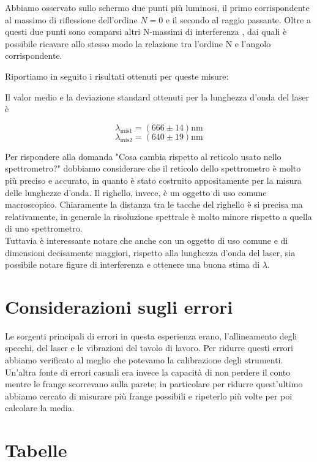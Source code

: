 \documentclass[letterpaper,12pt]{article}
\begin{document}
Abbiamo osservato sullo schermo due punti più luminosi, il primo corrispondente al massimo di riflessione dell'ordine $N = 0$ e il secondo al raggio passante.
Oltre a questi due punti sono comparsi altri N-massimi di interferenza , dai quali è possibile ricavare allo stesso modo la relazione tra l'ordine N e l'angolo corrispondente.

Riportiamo in seguito i risultati ottenuti per queste misure:


Il valor medio e la deviazione standard ottenuti per la lunghezza d'onda del laser è 

$$ \lambda_\text{mis1}= (666 \pm 14) \text{nm}$$
$$ \lambda_\text{mis2}= (640 \pm 19) \text{nm}$$



Per rispondere alla domanda "Cosa cambia rispetto al reticolo usato nello spettrometro?" dobbiamo 
considerare che il reticolo dello spettrometro è molto più preciso e accurato, in quanto è stato costruito appositamente per 
la misura delle lunghezze d'onda. Il righello, invece, è un oggetto di uso comune macroscopico. 
Chiaramente la distanza tra le tacche del righello è si precisa ma relativamente, in generale la risoluzione spettrale 
è molto minore rispetto a quella di uno spettrometro.\\
Tuttavia è interessante notare che anche con un oggetto di uso comune e di dimensioni decisamente maggiori, rispetto alla lunghezza d'onda del laser, sia possibile 
notare figure di interferenza e ottenere una buona stima di $\lambda$.

\section{Considerazioni sugli errori}
\label{sec:errori}
Le sorgenti principali di errori in questa esperienza erano, l'allineamento degli specchi, del laser
e le vibrazioni del tavolo di lavoro. Per ridurre questi errori abbiamo verificato al meglio che potevamo la calibrazione degli strumenti. 
Un'altra fonte di errori casuali era invece la capacità di non perdere il conto mentre le frange scorrevano sulla parete; in particolare per ridurre quest'ultimo 
abbiamo cercato di misurare più frange possibili e ripeterlo più volte per poi calcolare la media.


\section{Tabelle}
\end{document}
